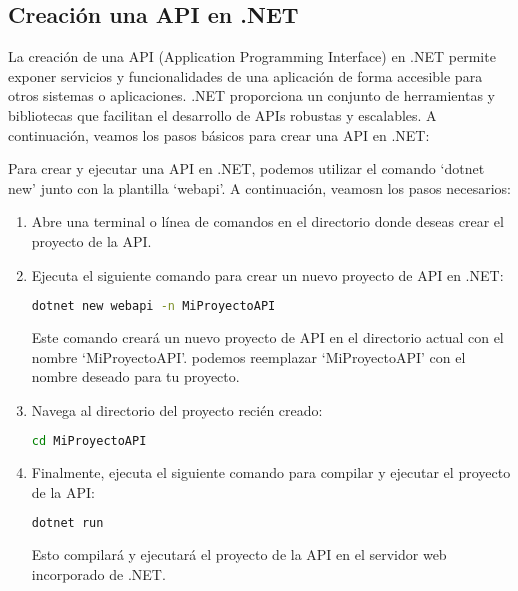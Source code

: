 \documentclass[executivepaper]{article}
\begin{document}
\subsection{Creación una API en .NET}

La creación de una API (Application Programming Interface) en .NET permite exponer servicios y funcionalidades de una aplicación de forma accesible para otros sistemas o aplicaciones. .NET proporciona un conjunto de herramientas y bibliotecas que facilitan el desarrollo de APIs robustas y escalables. A continuación, veamos los pasos básicos para crear una API en .NET:

Para crear y ejecutar una API en .NET, podemos utilizar el comando \enquote*{dotnet new} junto con la plantilla \enquote*{webapi}. A continuación, veamosn los pasos necesarios:

\begin{enumerate}
  \item Abre una terminal o línea de comandos en el directorio donde deseas crear el proyecto de la API.

  \item Ejecuta el siguiente comando para crear un nuevo proyecto de API en .NET:

 \begin{lstlisting}[language=bash]
  dotnet new webapi -n MiProyectoAPI
\end{lstlisting}

  Este comando creará un nuevo proyecto de API en el directorio actual con el nombre \enquote*{MiProyectoAPI}. podemos reemplazar \enquote*{MiProyectoAPI} con el nombre deseado para tu proyecto.

  \item Navega al directorio del proyecto recién creado:

 \begin{lstlisting}[language=bash]
  cd MiProyectoAPI
\end{lstlisting}

  \item Finalmente, ejecuta el siguiente comando para compilar y ejecutar el proyecto de la API:

 \begin{lstlisting}[language=bash]
  dotnet run
\end{lstlisting}

  Esto compilará y ejecutará el proyecto de la API en el servidor web incorporado de .NET.

\end{enumerate}
\end{document}
